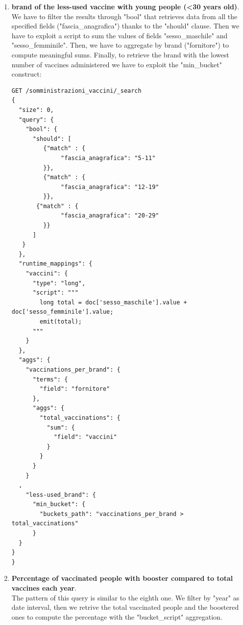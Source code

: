 \documentclass{article}
\begin{document}
\begin{enumerate}
\begin{lstlisting}
        "vaccinati": {
          "sum": {
            "field": "prima_dose"
          }
        },
        "vaccinati_Lombardia": {
          "filter": {
            "term": {
              "nome_area": "Lombardia"
            }
          },
          "aggs": {
            "dosi": {
              "sum": {
                "field": "prima_dose"
              }
            }
          }
        },
        "vaccini_percentage": {
          "bucket_script": {
            "buckets_path": {
              "vaccinatiLombardia": "vaccinati_Lombardia>dosi",
              "vaccinati": "vaccinati"
            },
            "script": "params.vaccinatiLombardia / params.vaccinati * 100"
          }
        }
      }
    }
  }
}
\end{lstlisting}
\item \textbf{brand of the less-used vaccine with young people (<30 years old)}.\\
We have to filter the results through "bool" that retrieves data from all the specified fields ("fascia\_anagrafica") thanks to the "should" clause. Then we have to exploit a script to sum the values of fields "sesso\_maschile" and "sesso\_femminile". Then, we have to aggregate by brand ("fornitore") to compute meaningful sums. Finally, to retrieve the brand with the lowest number of vaccines administered we have to exploit the "min\_bucket" construct:
\begin{lstlisting}
GET /somministrazioni_vaccini/_search
{
  "size": 0,
  "query": {
    "bool": {
      "should": [
	     {"match" : {
	          "fascia_anagrafica": "5-11" 
	     }},
	     {"match" : {
	          "fascia_anagrafica": "12-19" 
	     }},
       {"match" : {
	          "fascia_anagrafica": "20-29" 
	     }}
      ]
   }
  },
  "runtime_mappings": {
    "vaccini": {
      "type": "long",
      "script": """
        long total = doc['sesso_maschile'].value + doc['sesso_femminile'].value;
        emit(total);
      """
    }
  },
  "aggs": {
    "vaccinations_per_brand": {
      "terms": {
        "field": "fornitore"
      },
      "aggs": {
        "total_vaccinations": {
          "sum": {
            "field": "vaccini"
          }
        }
      }
    }
  ,
    "less-used_brand": {
      "min_bucket": {
        "buckets_path": "vaccinations_per_brand > total_vaccinations" 
      }
  }
}
}
\end{lstlisting}
\item \textbf{Percentage of vaccinated people with booster compared to total vaccines each year}.\\
The pattern of this query is similar to the eighth one. We filter by "year" as date interval, then we retrive the total vaccinated people and the boostered ones to compute the percentage with the "bucket\_script" aggregation.

\end{enumerate}
\end{document}
